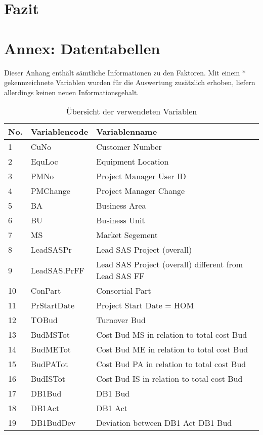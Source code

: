 
\section{Fazit}
\section*{Annex: Datentabellen}
Dieser Anhang enthält sämtliche Informationen zu den Faktoren. Mit einem * gekennzeichnete Variablen wurden für die Auswertung zusätzlich erhoben, liefern allerdings keinen neuen Informationsgehalt.
\begin{longtable}[ht]{p{} p{}p{}}
	\caption{Übersicht der verwendeten Variablen}\\
		\textbf{No.} & \textbf{Variablencode} & \textbf{Variablenname} \\\hline\endhead
    1     & CuNo  & Customer Number \\
2     & EquLoc & Equipment Location \\
3     & PMNo  & Project Manager User ID \\
4     & PMChange & Project Manager Change \\
5     & BA    & Business Area \\
6     & BU    & Business Unit \\
7     & MS    & Market Segement \\
8     & LeadSASPr & Lead SAS Project (overall) \\
9     & LeadSAS.PrFF & Lead SAS Project (overall) different from Lead SAS FF \\
10    & ConPart & Consortial Part \\
11    & PrStartDate & Project Start Date = HOM \\
12    & TOBud & Turnover Bud \\
13    & BudMSTot & Cost Bud MS in relation to total cost Bud \\
14    & BudMETot & Cost Bud ME in relation to total cost Bud  \\
15    & BudPATot & Cost Bud PA in relation to total cost Bud \\
16    & BudISTot & Cost Bud IS in relation to total cost Bud \\
17    & DB1Bud & DB1 Bud \\
18    & DB1Act & DB1 Act \\
19    & DB1BudDev & Deviation between DB1 Act DB1 Bud \\

\end{longtable}
